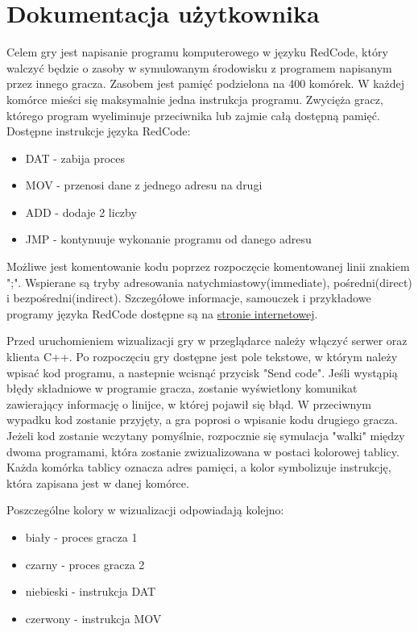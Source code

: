\chapter{Dokumentacja użytkownika}
Celem gry jest napisanie programu komputerowego w języku RedCode, który walczyć będzie o zasoby w symulowanym środowisku z programem napisanym przez innego gracza. Zasobem jest pamięć podzielona na 400 komórek. W każdej komórce mieści się maksymalnie jedna instrukcja programu. Zwycięża gracz, którego program wyeliminuje przeciwnika lub zajmie całą dostępną pamięć.
Dostępne instrukcje języka RedCode:
\begin{itemize}
\item DAT - zabija proces
\item MOV - przenosi dane z jednego adresu na drugi
\item ADD - dodaje 2 liczby
\item JMP - kontynuuje wykonanie programu od danego adresu
\end{itemize}
Możliwe jest komentowanie kodu poprzez rozpoczęcie komentowanej linii znakiem ";".
Wspierane są tryby adresowania natychmiastowy(immediate), pośredni(direct) i bezpośredni(indirect). Szczegółowe informacje, samouczek i przykładowe programy języka RedCode dostępne są na \href{http://vyznev.net/corewar/guide.html}{stronie internetowej}.

Przed uruchomieniem wizualizacji gry w przeglądarce należy włączyć serwer oraz klienta C++. Po rozpoczęciu gry dostępne jest pole tekstowe, w którym należy wpisać kod programu, a nastepnie wcisnąć przycisk "Send code". Jeśli wystąpią błędy składniowe w programie gracza, zostanie wyświetlony komunikat zawierający informację o linijce, w której pojawił się błąd. W przeciwnym wypadku kod zostanie przyjęty, a gra poprosi o wpisanie kodu drugiego gracza. Jeżeli kod zostanie wczytany pomyślnie, rozpocznie się symulacja "walki" między dwoma programami, która zostanie zwizualizowana w postaci kolorowej tablicy. Każda komórka tablicy oznacza adres pamięci, a kolor symbolizuje instrukcję, która zapisana jest w danej komórce.

Poszczególne kolory w wizualizacji odpowiadają kolejno:
\begin{itemize}
\item biały - proces gracza 1
\item czarny - proces gracza 2
\item niebieski - instrukcja DAT
\item czerwony - instrukcja MOV
\end{itemize}